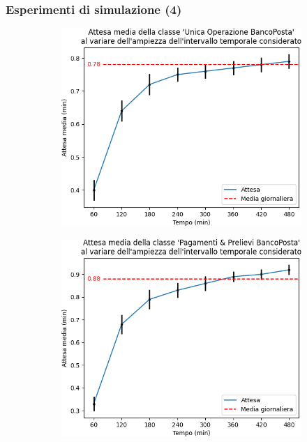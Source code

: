 \documentclass[
	usepdftitle=false,
	xcolor={table, dvipsnames},
	hyperref={
		pdftitle={Studio delle prestazioni di un Ufficio Postale ispirato a Poste Italiane},
    	pdfauthor={A. Chillotti, C. Cuffaro e S. Tiberi}
    }
]{beamer}
\begin{document}
\begin{frame}
\frametitle{Esperimenti di simulazione (4)}
\begin{figure}[ht]
\centering
\begin{subfigure}[b]{0.3\textwidth}
\centering
\includegraphics[width=\textwidth]{plots/day-from-empty-0}
\end{subfigure}
\begin{subfigure}[b]{0.3\textwidth}  
\centering 
\includegraphics[width=\textwidth]{plots/day-from-empty-1}
\end{subfigure}

\end{figure}
\end{frame}
\end{document}
